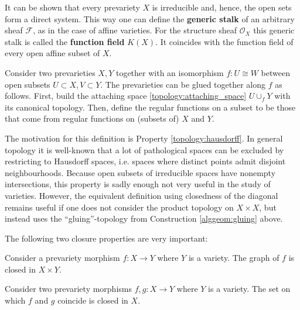     \begin{remark}
        It can be shown that every prevariety $X$ is irreducible and, hence, the open sets form a direct system. This way one can define the \textbf{generic stalk} of an arbitrary sheaf $\mathcal{F}$, as in the case of affine varieties. For the structure sheaf $\mathcal{O}_X$ this generic stalk is called the \textbf{function field} $K(X)$. It coincides with the function field of every open affine subset of $X$.
    \end{remark}

    \begin{construct}[Gluing]\label{alggeom:gluing}
        Consider two prevarieties $X,Y$ together with an isomorphism $f:U\cong W$ between open subsets $U\subset X,V\subset Y$. The prevarieties can be glued together along $f$ as follows. First, build the attaching space \ref{topology:attaching_space} $U\cup_fY$ with its canonical topology. Then, define the regular functions on a subset to be those that come from regular functions on (subsets of) $X$ and $Y$.
    \end{construct}

    \begin{remark}
        The motivation for this definition is Property \ref{topology:hausdorff}. In general topology it is well-known that a lot of pathological spaces can be excluded by restricting to Hausdorff spaces, i.e. spaces where distinct points admit disjoint neighbourhoods. Because open subsets of irreducible spaces have nonempty intersections, this property is sadly enough not very useful in the study of varieties. However, the equivalent definition using closedness of the diagonal remains useful if one does not consider the product topology on $X\times X$, but instead uses the ``gluing''-topology from Construction \ref{alggeom:gluing} above.
    \end{remark}

    The following two closure properties are very important:
    \begin{property}\label{alggeom:closed_graph}
        Consider a prevariety morphism $f:X\rightarrow Y$ where $Y$ is a variety. The graph of $f$ is closed in $X\times Y$.
    \end{property}
    \begin{property}
        Consider two prevariety morphisms $f,g:X\rightarrow Y$ where $Y$ is a variety. The set on which $f$ and $g$ coincide is closed in $X$.
    \end{property}

